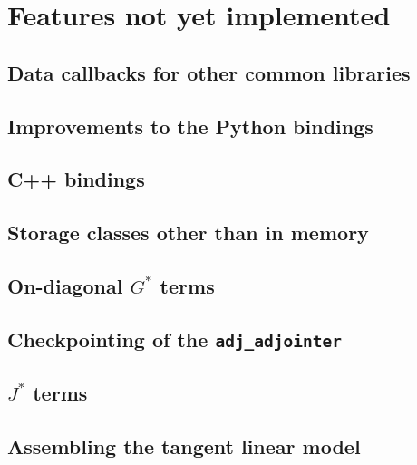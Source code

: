 \chapter{Features not yet implemented} \label{chap:todo}
\section{Data callbacks for other common libraries}
\section{Improvements to the Python bindings}
\section{C++ bindings}
\section{Storage classes other than in memory}
\section{On-diagonal $G^*$ terms} \label{sec:on_diagonal_g_terms}
\section{Checkpointing of the \texttt{adj_adjointer}}
\section{$J^*$ terms}
\section{Assembling the tangent linear model}
